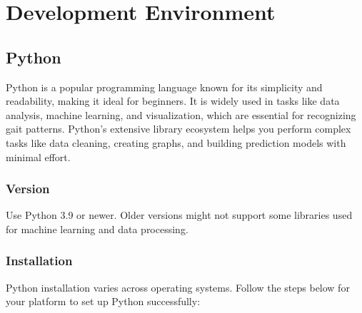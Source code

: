 %
%
%

\chapter{Development Environment}
\section{Python}

Python is a popular programming language known for its simplicity and readability, making it ideal for beginners. It is widely used in tasks like data analysis, machine learning, and visualization, which are essential for recognizing gait patterns. Python's extensive library ecosystem helps you perform complex tasks like data cleaning, creating graphs, and building prediction models with minimal effort\cite{Python:2024}.

\subsection{Version}
Use Python 3.9 or newer. Older versions might not support some libraries used for machine learning and data processing.\cite{PythonGuide:2023}

\subsection*{Installation}
Python installation varies across operating systems. Follow the steps below for your platform to set up Python successfully:

